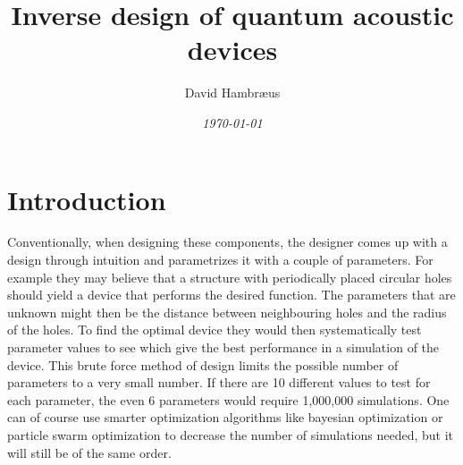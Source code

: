 \documentclass[11pt]{article}
\title{Inverse design of quantum acoustic devices}
\author{David Hambr\ae{}us}
\date{\textit{\today}}
\begin{document}
\maketitle



\tableofcontents

\printglossaries{}

\newpage

\section{Introduction}


Conventionally, when designing these components, the designer comes up with a
design through intuition and parametrizes it with a couple of parameters.
For example they may believe that a structure with periodically placed circular
holes should yield a device that performs the desired function.
The parameters that are unknown might then be the distance between neighbouring
holes and the radius of the holes.
To find the optimal device they would then systematically test parameter values
to see which give the best performance in a simulation of the device.
This brute force method of design limits the possible number of parameters to a
very small number.
If there are 10 different values to test for each parameter, the even 6
parameters would require 1,000,000 simulations.
One can of course use smarter optimization algorithms like bayesian optimization
or particle swarm optimization
to decrease the number of simulations needed, but it will still be of the same
order.
\end{document}
